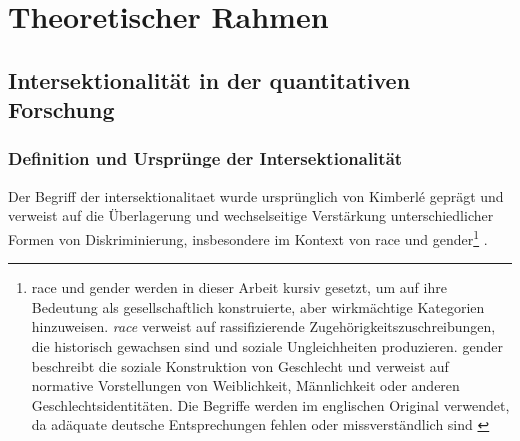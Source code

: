 
\section{Theoretischer Rahmen} \label{sec:theoretischer_rahmen}

\subsection{Intersektionalität in der quantitativen Forschung}

\subsubsection{Definition und Ursprünge der Intersektionalität}

Der Begriff der \gls{intersektionalitaet} wurde ursprünglich von Kimberlé \textcite{crenshawMappingMarginsIntersectionality1991} geprägt und verweist auf die Überlagerung und wechselseitige Verstärkung unterschiedlicher Formen von Diskriminierung, insbesondere im Kontext von \gls{race} und \gls{gender}\footnote{\gls{race} und \gls{gender} werden in dieser Arbeit kursiv gesetzt, um auf ihre Bedeutung als gesellschaftlich konstruierte, aber wirkmächtige Kategorien hinzuweisen. \textit{race} verweist auf rassifizierende Zugehörigkeitszuschreibungen, die historisch gewachsen sind und soziale Ungleichheiten produzieren. \gls{gender} beschreibt die soziale Konstruktion von Geschlecht und verweist auf normative Vorstellungen von Weiblichkeit, Männlichkeit oder anderen Geschlechtsidentitäten. Die Begriffe werden im englischen Original verwendet, da adäquate deutsche Entsprechungen fehlen oder missverständlich sind \parencite[vgl.][]{hallRaceArticulationSocieties1980, butlerGenderTroubleFeminism1990}} \parencite{hancockWhenMultiplicationDoesnt2007}.
